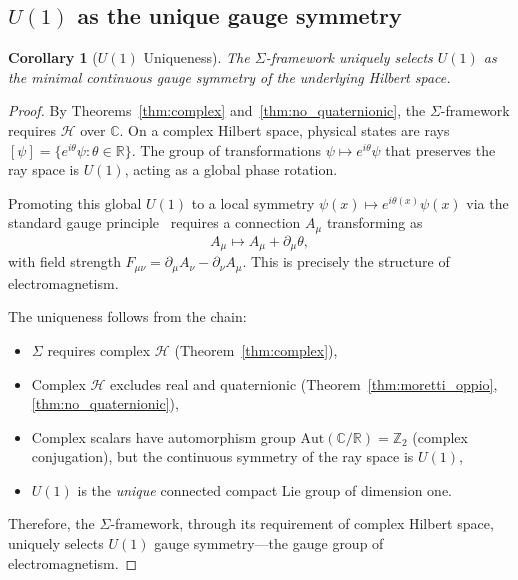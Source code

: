 \documentclass[letterpaper,twocolumn,superscriptaddress,longbibliography]{revtex4-2}
\newtheorem{corollary}[theorem]{Corollary}
\newcommand{\hilb}{\mathcal{H}}
\begin{document}
\subsection{$U(1)$ as the unique gauge symmetry}
\label{sec:U1_unique}

\begin{corollary}[$U(1)$ Uniqueness]
\label{cor:U1}
The $\Sigma$-framework uniquely selects $U(1)$ as the
minimal continuous gauge symmetry of the underlying
Hilbert space.
\end{corollary}

\begin{proof}
By Theorems~\ref{thm:complex} and~\ref{thm:no_quaternionic},
the $\Sigma$-framework requires $\hilb$ over $\mathbb{C}$.
On a complex Hilbert space, physical states are rays
$[\psi] = \{e^{i\theta}\psi : \theta \in \mathbb{R}\}$.
The group of transformations $\psi \mapsto e^{i\theta}\psi$
that preserves the ray space is $U(1)$, acting as a global
phase rotation.

Promoting this global $U(1)$ to a local symmetry
$\psi(x) \mapsto e^{i\theta(x)}\psi(x)$ via the standard
gauge principle~\cite{YangMills1954} requires a connection
$A_\mu$ transforming as
\begin{equation}
  A_\mu \mapsto A_\mu + \partial_\mu \theta,
  \label{eq:gauge_transform}
\end{equation}
with field strength $F_{\mu\nu} = \partial_\mu A_\nu
- \partial_\nu A_\mu$.
This is precisely the structure of electromagnetism.

The uniqueness follows from the chain:
\begin{itemize}
  \item $\Sigma$ requires complex $\hilb$
        (Theorem~\ref{thm:complex}),
  \item Complex $\hilb$ excludes real and quaternionic
        (Theorem~\ref{thm:moretti_oppio}, \ref{thm:no_quaternionic}),
  \item Complex scalars have automorphism group
        $\mathrm{Aut}(\mathbb{C}/\mathbb{R}) = \mathbb{Z}_2$
        (complex conjugation), but the continuous
        symmetry of the ray space is $U(1)$,
  \item $U(1)$ is the \emph{unique} connected compact Lie
        group of dimension one.
\end{itemize}
Therefore, the $\Sigma$-framework, through its requirement
of complex Hilbert space, uniquely selects $U(1)$ gauge
symmetry---the gauge group of electromagnetism.
\end{proof}
\end{document}
